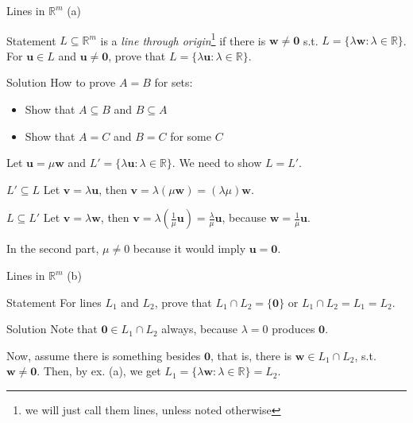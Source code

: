 \documentclass[10pt]{beamer}
\begin{document}
\begin{frame}{Lines in $\mathbb R^m$ (a)}
    \begin{block}{Statement}
        $L \subseteq \mathbb R^m$ is a \textit{line through origin}\footnote{we will just call them lines, unless noted otherwise} if there is $\mathbf w \neq \mathbf 0$ s.t. $L = \{\lambda \mathbf w : \lambda \in \mathbb R\}$. For $\mathbf u \in L$ and $\mathbf u \neq \mathbf 0$, prove that $L = \{\lambda \mathbf u : \lambda \in \mathbb R\}$.
    \end{block}
\end{frame}

\begin{frame}{Solution}
    How to prove $A=B$ for sets:
    \begin{itemize}
        \item Show that $A \subseteq B$ and $B \subseteq A$
        \item Show that $A = C$ and $B = C$ for some $C$
    \end{itemize}
    
    Let $\mathbf u = \mu \mathbf w$ and $L' = \{\lambda \mathbf u : \lambda \in \mathbb R\}$. We need to show $L = L'$.
    \begin{block}{$L' \subseteq L$}
        Let $\mathbf v = \lambda \mathbf u$, then $\mathbf v = \lambda(\mu \mathbf w) = (\lambda \mu) \mathbf w$.
    \end{block}
    \begin{block}{$L \subseteq L'$}
        Let $\mathbf v = \lambda \mathbf w$, then $\mathbf v = \lambda \left(\frac{1}{\mu} \mathbf u\right) =\frac{\lambda}{\mu} \mathbf u$, because $\mathbf w = \frac{1}{\mu} \mathbf u$.
    \end{block}
    In the second part, $\mu \neq 0$ because it would imply $\mathbf u = \mathbf 0$.
\end{frame}

\begin{frame}{Lines in $\mathbb R^m$ (b)}
    \begin{block}{Statement}
        For lines $L_1$ and $L_2$, prove that $L_1 \cap L_2 = \{\mathbf 0\}$ or $L_1 \cap L_2 = L_1 = L_2$.
    \end{block}
\end{frame}

\begin{frame}{Solution}
    Note that $\mathbf 0 \in L_1 \cap L_2$ always, because $\lambda=0$ produces $\mathbf 0$.

    Now, assume there is something besides $\mathbf 0$, that is, there is $\mathbf w \in L_1 \cap L_2$, s.t. $\mathbf w \neq \mathbf 0$. Then, by ex. (a), we get $L_1 = \{\lambda \mathbf w : \lambda \in \mathbb R\} = L_2$.
\end{frame}
\end{document}
